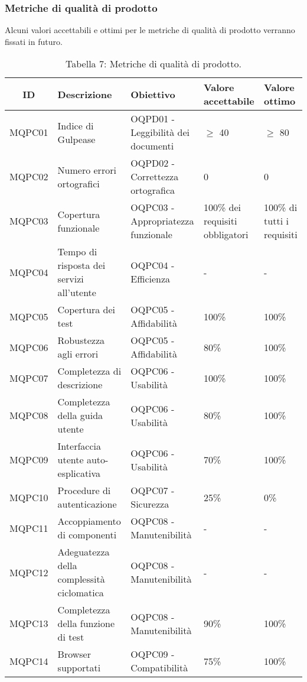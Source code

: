 \subsubsection{Metriche di qualità di prodotto}
Alcuni valori accettabili e ottimi per le metriche di qualità di prodotto verranno fissati in futuro.
\begin{table}[H]
	\centering
	\begin{tabularx}{\textwidth}{|c|X|X|X|X|}
		\hline
		\textbf{ID} & \textbf{Descrizione} & \textbf{Obiettivo} & \textbf{Valore accettabile} & \textbf{Valore ottimo}\\
		\hline
		MQPC01 & Indice di Gulpease & OQPD01 - Leggibilità dei documenti & $\geq$ 40 & $\geq$ 80 \\
		\hline
		MQPC02 & Numero errori ortografici & OQPD02 - Correttezza ortografica & 0 & 0 \\
		\hline
		MQPC03 & Copertura funzionale & OQPC03 - Appropriatezza funzionale & 100\% dei requisiti obbligatori & 100\% di tutti i requisiti\\
		\hline
		MQPC04 & Tempo di risposta dei servizi all'utente & OQPC04 - Efficienza & - & - \\
		\hline
		MQPC05 & Copertura dei test & OQPC05 - Affidabilità & 100\% & 100\% \\
		\hline
		MQPC06 & Robustezza agli errori & OQPC05 - Affidabilità & 80\% & 100\% \\
		\hline
		MQPC07 & Completezza di descrizione & OQPC06 - Usabilità & 100\% &  100\% \\
		\hline
		MQPC08 & Completezza della guida utente & OQPC06 - Usabilità & 80\% &  100\% \\
		\hline
		MQPC09 & Interfaccia utente auto-esplicativa & OQPC06 - Usabilità & 70\% &  100\% \\
		\hline
		MQPC10 & Procedure di autenticazione & OQPC07 - Sicurezza & 25\% &  0\% \\
		\hline
		MQPC11 & Accoppiamento di componenti & OQPC08 - Manutenibilità & - & - \\
		\hline
		MQPC12 & Adeguatezza della complessità ciclomatica & OQPC08 - Manutenibilità & - & - \\
		\hline
		MQPC13 & Completezza della funzione di test & OQPC08 - Manutenibilità & 90\% & 100\% \\
		\hline
		MQPC14 & Browser supportati & OQPC09 - Compatibilità & 75\% & 100\% \\
		\hline
	\end{tabularx}
	\caption{Tabella 7: Metriche di qualità di prodotto.}
\end{table}
